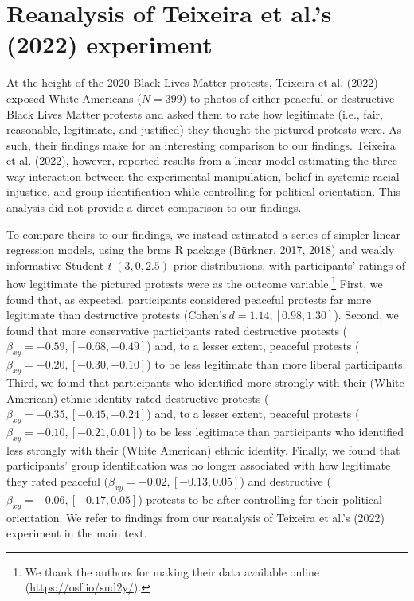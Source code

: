 \documentclass[12pt, letterpaper]{article}
\begin{document}
\hypertarget{reanalysis-of-teixeira-et-al.s--teixeira_white_2022-experiment}{%
\section{Reanalysis of Teixeira et al.'s (2022)
experiment}\label{reanalysis-of-teixeira-et-al.s--teixeira_white_2022-experiment}}

At the height of the 2020 Black Lives Matter protests, Teixeira et al.
(2022) exposed White Americans (\(N = 399\)) to photos of either
peaceful or destructive Black Lives Matter protests and asked them to
rate how legitimate (i.e., fair, reasonable, legitimate, and justified)
they thought the pictured protests were. As such, their findings make
for an interesting comparison to our findings. Teixeira et al. (2022),
however, reported results from a linear model estimating the three-way
interaction between the experimental manipulation, belief in systemic
racial injustice, and group identification while controlling for
political orientation. This analysis did not provide a direct comparison
to our findings.

To compare theirs to our findings, we instead estimated a series of
simpler linear regression models, using the brms R package (Bürkner,
2017, 2018) and weakly informative Student-\emph{t} \((3, 0, 2.5)\)
prior distributions, with participants' ratings of how legitimate the
pictured protests were as the outcome variable.\footnote{We thank the
  authors for making their data available online
  (\url{https://osf.io/sud2y/}).} First, we found that, as expected,
participants considered peaceful protests far more legitimate than
destructive protests (\(\text{Cohen's}~d = 1.14, [0.98, 1.30]\)).
Second, we found that more conservative participants rated destructive
protests (\(\beta_{xy} = -0.59, [-0.68, -0.49]\)) and, to a lesser
extent, peaceful protests (\(\beta_{xy} = -0.20, [-0.30, -0.10]\)) to be
less legitimate than more liberal participants. Third, we found that
participants who identified more strongly with their (White American)
ethnic identity rated destructive protests
(\(\beta_{xy} = -0.35, [-0.45, -0.24]\)) and, to a lesser extent,
peaceful protests (\(\beta_{xy} = -0.10, [-0.21, 0.01]\)) to be less
legitimate than participants who identified less strongly with their
(White American) ethnic identity. Finally, we found that participants'
group identification was no longer associated with how legitimate they
rated peaceful (\(\beta_{xy} = -0.02, [-0.13, 0.05]\)) and destructive
(\(\beta_{xy} = -0.06, [-0.17, 0.05]\)) protests to be after controlling
for their political orientation. We refer to findings from our
reanalysis of Teixeira et al.'s (2022) experiment in the main text.
\end{document}
